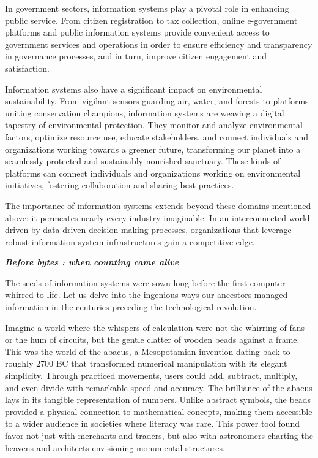 \documentclass[
  letterpaper,
  DIV=11,
  numbers=noendperiod]{scrreprt}
\begin{document}
In government sectors, information systems play a pivotal role in
enhancing public service. From citizen registration to tax collection,
online e-government platforms and public information systems provide
convenient access to government services and operations in order to
ensure efficiency and transparency in governance processes, and in turn,
improve citizen engagement and satisfaction.

Information systems also have a significant impact on environmental
sustainability. From vigilant sensors guarding air, water, and forests
to platforms uniting conservation champions, information systems are
weaving a digital tapestry of environmental protection. They monitor and
analyze environmental factors, optimize resource use, educate
stakeholders, and connect individuals and organizations working towards
a greener future, transforming our planet into a seamlessly protected
and sustainably nourished sanctuary. These kinds of platforms can
connect individuals and organizations working on environmental
initiatives, fostering collaboration and sharing best practices.

The importance of information systems extends beyond these domains
mentioned above; it permeates nearly every industry imaginable. In an
interconnected world driven by data-driven decision-making processes,
organizations that leverage robust information system infrastructures
gain a competitive edge.

\textbf{\emph{Before bytes : when counting came alive}}

The seeds of information systems were sown long before the first
computer whirred to life. Let us delve into the ingenious ways our
ancestors managed information in the centuries preceding the
technological revolution.

Imagine a world where the whispers of calculation were not the whirring
of fans or the hum of circuits, but the gentle clatter of wooden beads
against a frame. This was the world of the abacus, a Mesopotamian
invention dating back to roughly 2700 BC that transformed numerical
manipulation with its elegant simplicity. Through practiced movements,
users could add, subtract, multiply, and even divide with remarkable
speed and accuracy. The brilliance of the abacus lays in its tangible
representation of numbers. Unlike abstract symbols, the beads provided a
physical connection to mathematical concepts, making them accessible to
a wider audience in societies where literacy was rare. This power tool
found favor not just with merchants and traders, but also with
astronomers charting the heavens and architects envisioning monumental
structures.
\end{document}
